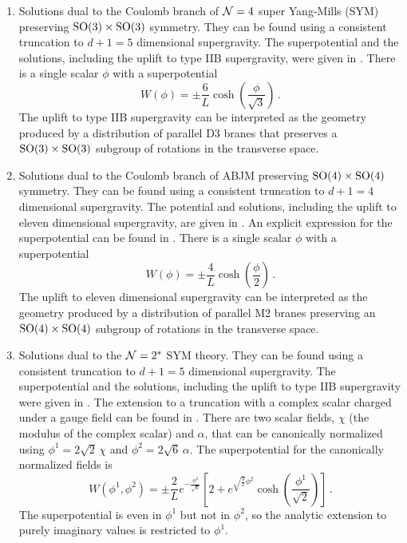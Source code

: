\begin{enumerate}
\item Solutions dual to the Coulomb branch of $\mathcal{N}=4$ super Yang-Mills (SYM) preserving $\mathrm{SO}(3)\times \mathrm{SO}(3)$ symmetry.
They can be found using a consistent truncation to $d+1=5$ dimensional supergravity.
The superpotential and the solutions, including the uplift to type IIB supergravity, were given in \cite{Freedman:1999gk,Cvetic:1999xx}.
There is a single scalar $\phi$ with a superpotential
\begin{equation}
	W(\phi)= \pm \frac{6}{L}\cosh\left(\frac{\phi}{\sqrt{3}}\right)\,.
\end{equation}
The uplift to type IIB supergravity can be interpreted as the geometry produced by a distribution of parallel D3 branes that preserves a $\mathrm{SO}(3)\times \mathrm{SO}(3)$ subgroup of rotations in the transverse space.

\item Solutions dual to the Coulomb branch of ABJM preserving $\mathrm{SO}(4)\times \mathrm{SO}(4)$ symmetry.
They can be found using a consistent truncation to $d+1=4$ dimensional supergravity.
The potential and solutions, including the uplift to eleven dimensional supergravity, are given in \cite{Cvetic:1999xx}.
An explicit expression for the superpotential can be found in \eg \cite{Tarrio:2013qga}.
There is a single scalar $\phi$ with a superpotential
\begin{equation}
	W(\phi)=\pm\frac{4}{L}\cosh \left(\frac{\phi}{2}\right)\,.
\end{equation}
The uplift to eleven dimensional supergravity can be interpreted as the geometry produced by a distribution of parallel M2 branes preserving an $\mathrm{SO}(4)\times \mathrm{SO}(4)$ subgroup of rotations in the transverse space.

\item Solutions dual to the $\mathcal{N}=2^*$ SYM theory.
They can be found using a consistent truncation to $d+1=5$ dimensional supergravity.
The superpotential and the solutions, including the uplift to type IIB supergravity were given in \cite{Pilch:2000ue}.
The extension to a truncation with a complex scalar charged under a gauge field can be found in \cite{Bobev:2010de}.
There are two scalar fields, $\chi$ (the modulus of the complex scalar) and $ \alpha$, that can be canonically normalized using $\phi^1=2\sqrt{2}\,\chi$  and $\phi^2= 2\sqrt{6}\,\alpha$.
The superpotential for the canonically normalized fields is
\begin{equation}
	W(\phi^1,\phi^2)=\pm\frac{2}{L} e^{-\frac{\phi^2}{\sqrt{6}}} \left[2 + e^{\sqrt{\frac{3}{2}}\phi^2} \cosh\left(\frac{\phi^1}{\sqrt{2}}\right)\right]\,.
\end{equation}
The superpotential is even in $\phi^1$ but not in $\phi^2$, so the analytic extension to purely imaginary values is restricted to $\phi^1$. 


\end{enumerate}
